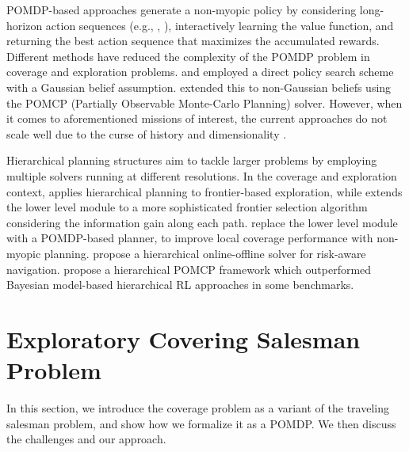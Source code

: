 \documentclass[letterpaper]{article} %
\newcommand{\ph}[1]{{\textbf{#1}:}} %
\begin{document}
POMDP-based approaches generate a non-myopic policy by considering long-horizon action sequences (e.g., \cite{kurniawati2011motion}, \cite{bai2015intention}), interactively learning the value function, and returning the best action sequence that maximizes the accumulated rewards. Different methods have reduced the complexity of the POMDP problem in coverage and exploration problems. \citet{indelman2015planning} and \citet{martinez2009bayesian} employed a direct policy search scheme with a Gaussian belief assumption. \citet{Lauri2016planning} extended this to non-Gaussian beliefs using the POMCP (Partially Observable Monte-Carlo Planning) solver. %
However, when it comes to aforementioned missions of interest, the current approaches do not scale well due to the curse of history and dimensionality \cite{Pineau03}.

Hierarchical planning structures \cite{kaelbling2011planning} aim to tackle larger problems by employing multiple solvers running at different resolutions.  
%
In the coverage and exploration context, \citet{umari2017autonomous} applies hierarchical planning to frontier-based exploration, while  \cite{dang2019explore} extends the lower level module to a more sophisticated frontier selection algorithm considering the information gain along each path. \citet{Lauri2016planning} replace the lower level module with a POMDP-based planner, to improve local coverage performance with non-myopic planning. \citet{kim2019bi} propose a hierarchical online-offline solver for risk-aware navigation. \citet{vien2015hierarchical} propose a hierarchical POMCP framework which outperformed Bayesian model-based hierarchical RL approaches in some benchmarks.

\section{Exploratory Covering Salesman Problem}
\label{sec:ECSPasPOMDP}
In this section, we introduce the coverage problem as a variant of the traveling salesman problem, and show how we formalize it as a POMDP. We then discuss the challenges and our approach. %
\end{document}
